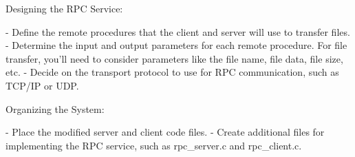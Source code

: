 Designing the RPC Service:

- Define the remote procedures that the client and server will use to transfer files. 
- Determine the input and output parameters for each remote procedure. 
  For file transfer, you'll need to consider parameters like the file name, file data, file size, etc.
- Decide on the transport protocol to use for RPC communication, such as TCP/IP or UDP.

Organizing the System:

- Place the modified server and client code files.
- Create additional files for implementing the RPC service, such as rpc_server.c and rpc_client.c.